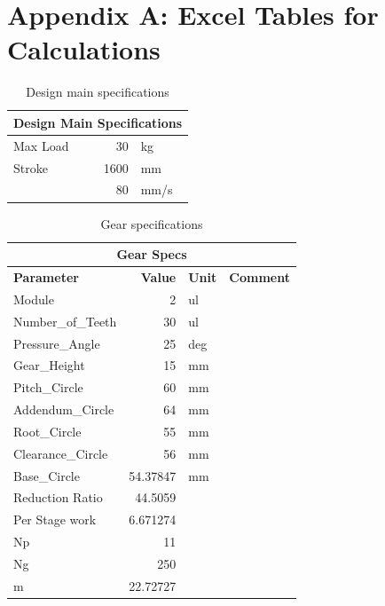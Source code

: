 \appendix
\section{Appendix A: Excel Tables for Calculations}
\label{app:A_excel}

\begin{table}[H]
  \centering
  \caption{Design main specifications}
  \begin{tabular}{|r|r|l|}
    \hline
    \multicolumn{3}{|c|}{\textbf{Design Main Specifications}} \\
    \hline
    \multicolumn{1}{|l|}{Max Load} & 30 & kg \\
    \multicolumn{1}{|l|}{Stroke} & 1600 & mm \\
    & 80 & mm/s \\
    \hline
  \end{tabular}
  \label{tab:design_main_specs}
\end{table}

\begin{table}[H]
  \centering
  \caption{Gear specifications}
  \begin{tabular}{|l|r|l|l|}
    \hline
    \multicolumn{4}{|c|}{\textbf{Gear Specs}} \\
    \hline
    \textbf{Parameter} & \textbf{Value} & \textbf{Unit} & \textbf{Comment} \\
    \hline
    Module & 2 & ul & \\
    Number\_of\_Teeth & 30 & ul & \\
    Pressure\_Angle & 25 & deg & \\
    Gear\_Height & 15 & mm & \\
    Pitch\_Circle & 60 & mm & \\
    Addendum\_Circle & 64 & mm & \\
    Root\_Circle & 55 & mm & \\
    Clearance\_Circle & 56 & mm & \\
    Base\_Circle & 54.37847 & mm & \\
    \hline
    Reduction Ratio & 44.5059 & & \\
    Per Stage work & 6.671274 & & \\
    Np & 11 & & \\
    Ng & 250 & & \\
    m & 22.72727 & & \\
    \hline
  \end{tabular}
  \label{tab:gear_specs}
\end{table}

